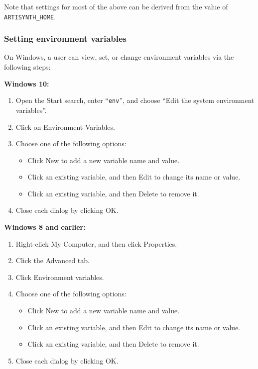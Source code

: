 
Note that settings for most of the above can be derived from the value
of {\tt ARTISYNTH\_HOME}.

\ifWindows
\subsubsection{Setting environment variables}
\label{settingWindowsVariables}

On Windows, a user can view, set, or change environment variables via
the following steps:

{\bf Windows 10:}

\begin{enumerate}

\item Open the {\sf Start} search, enter ``{\tt env}'', and choose
{\sf ``Edit the system environment variables''}.
\item Click on {\sf Environment Variables}.
\item Choose one of the following options:

\begin{itemize}
\item Click {\sf New} to add a new variable name and value.
\item Click an existing variable, and then {\sf Edit} to change its name or value.
\item Click an existing variable, and then {\sf Delete} to remove it.
\end{itemize}

\item Close each dialog by clicking {\sf OK}.

\end{enumerate}

{\bf Windows 8 and earlier:}

\begin{enumerate}

\item Right-click {\sf My Computer}, and then click {\sf Properties}.
\item Click the {\sf Advanced} tab.
\item Click {\sf Environment variables}.
\item Choose one of the following options:

\begin{itemize}
\item Click {\sf New} to add a new variable name and value.
\item Click an existing variable, and then {\sf Edit} to change its name or value.
\item Click an existing variable, and then {\sf Delete} to remove it.
\end{itemize}

\item Close each dialog by clicking {\sf OK}.

\end{enumerate}

